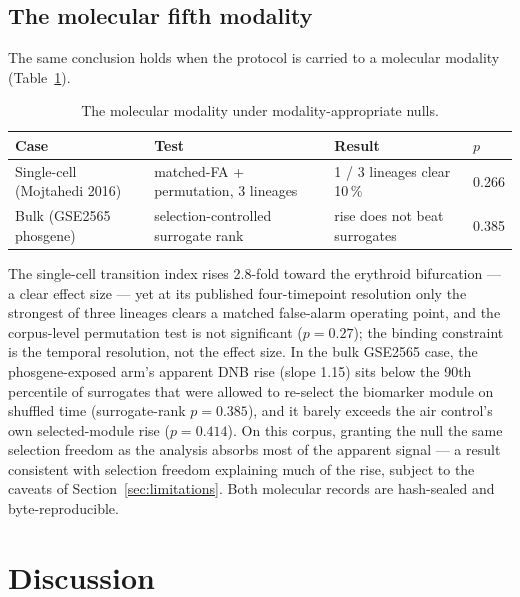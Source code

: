 \documentclass[aip,cha,preprint,amsmath,amssymb]{revtex4-2}
\begin{document}
\subsection{The molecular fifth modality}\label{sec:dnb}

The same conclusion holds when the protocol is carried to a molecular
modality (Table~\ref{tab:dnb}).

\begin{table}[h!]
\centering
\scriptsize
\setlength{\tabcolsep}{3pt}
\begin{tabular}{llll}
\toprule
Case & Test & Result & $p$ \\
\midrule
Single-cell (Mojtahedi 2016) & matched-FA + permutation, 3 lineages & 1 / 3 lineages clear 10\,\% & 0.266 \\
Bulk (GSE2565 phosgene) & selection-controlled surrogate rank & rise does not beat surrogates & 0.385 \\
\bottomrule
\end{tabular}
\caption{The molecular modality under modality-appropriate nulls.}
\label{tab:dnb}
\end{table}

The single-cell transition index rises 2.8-fold toward the erythroid
bifurcation --- a clear effect size --- yet at its published
four-timepoint resolution only the strongest of three lineages clears a
matched false-alarm operating point, and the corpus-level permutation
test is not significant ($p = 0.27$); the binding constraint is the
temporal resolution, not the effect size. In the bulk GSE2565 case, the
phosgene-exposed arm's apparent DNB rise (slope 1.15) sits below the
90th percentile of surrogates that were allowed to re-select the
biomarker module on shuffled time (surrogate-rank $p = 0.385$), and it
barely exceeds the air control's own selected-module rise
($p = 0.414$). On this corpus, granting the null the same selection
freedom as the analysis absorbs most of the apparent signal --- a
result consistent with selection freedom explaining much of the rise,
subject to the caveats of Section~\ref{sec:limitations}. Both molecular
records are hash-sealed and byte-reproducible.

\section{Discussion}\label{sec:discussion}
\end{document}
